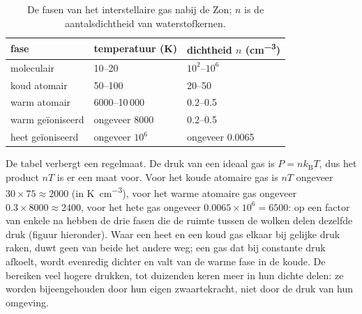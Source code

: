 \begin{table}[htbp]
\centering
\small
\begin{tabular}{lll}
\hline
fase & temperatuur (K) & dichtheid $n$ (\unit{cm^{-3}}) \\
\hline
moleculair & 10--20 & $10^2$--$10^6$ \\
koud atomair & 50--100 & 20--50 \\
warm atomair & 6000--10\,000 & 0.2--0.5 \\
warm geïoniseerd & ongeveer 8000 & 0.2--0.5 \\
heet geïoniseerd & ongeveer $10^6$ & ongeveer 0.0065 \\
\hline
\end{tabular}
\caption{De fasen van het interstellaire gas nabij de Zon; $n$ is de
aantalsdichtheid van waterstofkernen.}
\label{tab:b2:ism-star-formation:phases}
\end{table}

De tabel verbergt een regelmaat. De druk van een ideaal gas is
$P = n k_{\mathrm B} T$, dus het product $nT$ is er een maat voor. Voor het koude atomaire
gas is $nT$ ongeveer $30\times75 \approx 2000$ (in \unit{K.cm^{-3}}), voor het warme
atomaire gas ongeveer $0.3\times8000 \approx 2400$, voor het hete gas ongeveer
$0.0065\times10^6 = 6500$: op een factor van enkele na hebben de drie fasen die
de ruimte tussen de wolken delen dezelfde druk (figuur hieronder).
Waar een heet en een koud gas elkaar bij gelijke druk raken, duwt geen van beide het andere
weg; een gas dat bij constante druk afkoelt, wordt evenredig dichter en
valt van de warme fase in de koude. De  bereiken veel hogere drukken, tot duizenden keren meer in hun dichte delen: ze worden bijeengehouden door hun eigen zwaartekracht, niet door de
druk van hun omgeving.

